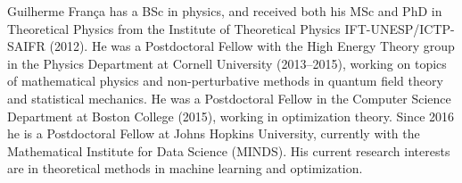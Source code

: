 \documentclass[10pt,journal,compsoc]{IEEEtran}
\begin{document}
\ifCLASSOPTIONcaptionsoff
  \newpage
\fi





%
%
%



%



% 

\begin{IEEEbiography}{Guilherme Fran\c ca} 
has a BSc in physics, and received both his MSc and 
PhD in Theoretical Physics from the Institute of 
Theoretical Physics IFT-UNESP/ICTP-SAIFR (2012). He was a Postdoctoral Fellow
with the High Energy Theory group in the Physics Department 
at Cornell University (2013--2015), working on topics of mathematical physics
and non-perturbative methods in quantum field theory 
and statistical mechanics.
He was a Postdoctoral Fellow in
the Computer Science Department at Boston College (2015), working in
optimization theory.
Since 2016 he is a Postdoctoral Fellow at Johns Hopkins University, currently
with the Mathematical Institute for Data Science (MINDS). 
His current research interests are in theoretical methods in 
machine learning 
and optimization.
\end{IEEEbiography}
\end{document}

